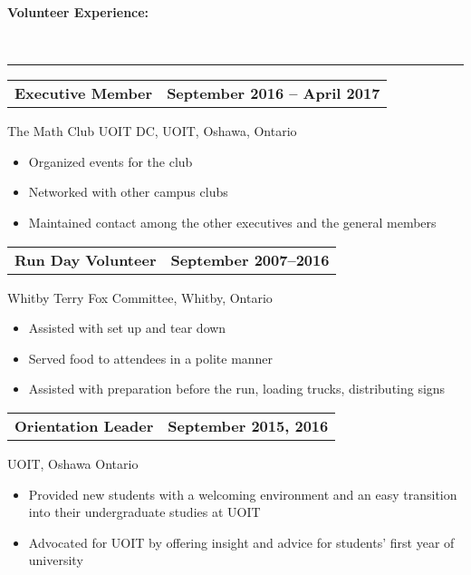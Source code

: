 \documentclass[]{article}
\begin{document}
\begin{large} \textbf{Volunteer Experience:} \end{large} \\
\rule[1.2ex]{\linewidth}{0.4pt}
\begin{tabu}  to 
\textbf{Executive Member} & \textbf{September 2016 -- April 2017}\\
\end{tabu}
%
The Math Club UOIT DC, UOIT, Oshawa, Ontario
%
\begin{itemize}
\item
  Organized events for the club
\item
  Networked with other campus clubs
\item
  Maintained contact among the other executives and the general members
\end{itemize}
\begin{tabu}  to 
\textbf{Run Day Volunteer} & \textbf{September 2007--2016} \\
\end{tabu}
%
Whitby Terry Fox Committee, Whitby, Ontario
%
\begin{itemize}
\item
  Assisted with set up and tear down
\item
  Served food to attendees in a polite manner
\item
  Assisted with preparation before the run, loading trucks,
  distributing signs
\end{itemize}
\begin{tabu} to 
\textbf{Orientation Leader} & \textbf{September 2015, 2016} \\
\end{tabu}
%
UOIT, Oshawa Ontario
%
\begin{itemize}
\item
  Provided new students with a welcoming environment and an easy
  transition into their undergraduate studies at UOIT
\item
  Advocated for UOIT by offering insight and advice for students'
  first year of university
\end{itemize}
\end{document}
